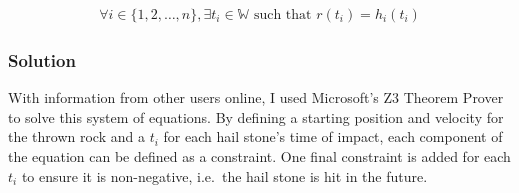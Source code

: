 \documentclass[11pt]{article}
\begin{document}
\begin{align*}
    \forall i \in \{1, 2, \dots, n\}, \exists t_i \in \mathbb{W} \text{ such that } r(t_i) = h_i(t_i)
\end{align*}

\subsubsection{Solution}
\label{subsubsec:solution}

With information from other users online, I used Microsoft's Z3 Theorem Prover to solve this system of equations.
By defining a starting position and velocity for the thrown rock and a $t_i$ for each hail stone's time of impact, each
    component of the equation can be defined as a constraint.
One final constraint is added for each $t_i$ to ensure it is non-negative, i.e.\ the hail stone is hit in the future.
\end{document}
